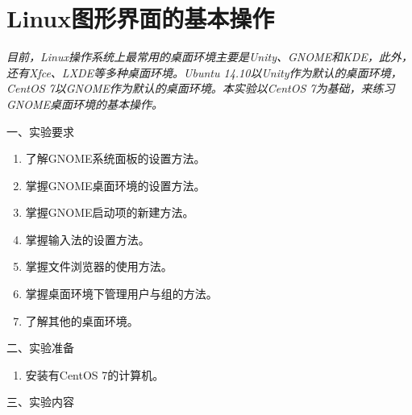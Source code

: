 \chapter{Linux图形界面的基本操作}

{\itshape
目前，Linux操作系统上最常用的桌面环境主要是Unity、GNOME和KDE，此外，还有Xfce、LXDE等多种桌面环境。Ubuntu 14.10以Unity作为默认的桌面环境，CentOS 7以GNOME作为默认的桌面环境。本实验以CentOS 7为基础，来练习GNOME桌面环境的基本操作。
}

\vspace{0.2in}
\noindent
一、实验要求
\begin{enumerate}
  \item 了解GNOME系统面板的设置方法。
  \item 掌握GNOME桌面环境的设置方法。
  \item 掌握GNOME启动项的新建方法。
  \item 掌握输入法的设置方法。
  \item 掌握文件浏览器的使用方法。
  \item 掌握桌面环境下管理用户与组的方法。
  \item 了解其他的桌面环境。
\end{enumerate}

\vspace{0.2in}
\noindent
二、实验准备
\begin{enumerate}
  \item 安装有CentOS 7的计算机。
\end{enumerate}

\vspace{0.2in}
\noindent
三、实验内容

